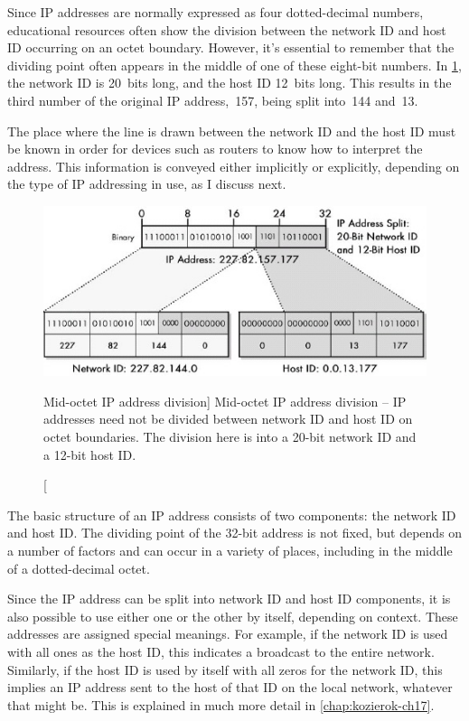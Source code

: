 Since IP addresses are normally expressed as four dotted-decimal
numbers, educational resources often show the division between the
network ID and host ID occurring on an octet boundary. However, it's
essential to remember that the dividing point often appears in the
middle of one of these eight-bit numbers.
In \cref{fig:slash-20}, the network ID is 20~bits long, and the host ID 12~bits long.
This results in the third number of the original IP address,~157, being split into~144 and~13.

The place where the line is drawn between the network ID and the host ID
must be known in order for devices such as routers to know how to
interpret the address. This information is conveyed either implicitly or
explicitly, depending on the type of IP addressing in use, as I discuss
next.


\begin{figure}
   \centering
   \includegraphics[width=.6\textwidth]{images/slash-20.jpg}
   \caption
      [Mid-octet IP address division]
      {Mid-octet IP address division -- IP addresses need not be divided between network ID and host ID on octet boundaries.
      The division here is into a 20-bit network ID and a 12-bit host ID.}
   \label{fig:slash-20}
\end{figure}


\begin{keyconcept}
The basic structure of an IP address consists of two components: the network ID and host ID.
The dividing point of the 32-bit address is not fixed, but depends on a number of factors and can occur in a variety of places, including in the middle of a dotted-decimal octet.
\end{keyconcept}

Since the IP address can be split into network ID and host ID
components, it is also possible to use either one or the other by
itself, depending on context. These addresses are assigned special
meanings. For example, if the network ID is used with all ones as the
host ID, this indicates a broadcast to the entire network. Similarly, if
the host ID is used by itself with all zeros for the network ID, this
implies an IP address sent to the host of that ID on the local network,
whatever that might be.
This is explained in much more detail in \vref{chap:kozierok-ch17}.

